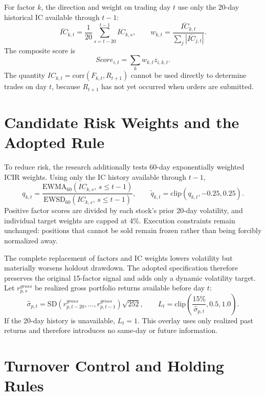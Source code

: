 \documentclass[a4paper,11pt,openany]{report}
\begin{document}
For factor $k$, the direction and weight on trading day $t$ use only the 20-day historical IC available through $t-1$:
\begin{equation}
\bar{IC}_{k,t}=\frac{1}{20}\sum_{s=t-20}^{t-1}IC_{k,s},\qquad
w_{k,t}=\frac{\bar{IC}_{k,t}}{\sum_j |\bar{IC}_{j,t}|}.
\end{equation}
The composite score is
\begin{equation}
Score_{i,t}=\sum_k w_{k,t}z_{i,k,t}.
\end{equation}
The quantity $IC_{k,t}=\mathrm{corr}(F_{k,t},R_{t+1})$ cannot be used directly to determine trades on day $t$, because $R_{t+1}$ has not yet occurred when orders are submitted.

\section{Candidate Risk Weights and the Adopted Rule}

To reduce risk, the research additionally tests 60-day exponentially weighted ICIR weights. Using only the IC history available through $t-1$,
\begin{equation}
q_{k,t}=\frac{\mathrm{EWMA}_{60}(IC_{k,s},\,s\le t-1)}{\mathrm{EWSD}_{60}(IC_{k,s},\,s\le t-1)},\qquad
\tilde q_{k,t}=\mathrm{clip}(q_{k,t},-0.25,0.25).
\end{equation}
Positive factor scores are divided by each stock's prior 20-day volatility, and individual target weights are capped at 4\%. Execution constraints remain unchanged: positions that cannot be sold remain frozen rather than being forcibly normalized away.

The complete replacement of factors and IC weights lowers volatility but materially worsens holdout drawdown. The adopted specification therefore preserves the original 15-factor signal and adds only a dynamic volatility target. Let $r^{gross}_{p,s}$ be realized gross portfolio returns available before day $t$:
\begin{equation}
\widehat\sigma_{p,t}=\mathrm{SD}(r^{gross}_{p,t-20},\ldots,r^{gross}_{p,t-1})\sqrt{252},\qquad
L_t=\mathrm{clip}\left(\frac{15\%}{\widehat\sigma_{p,t}},0.5,1.0\right).
\end{equation}
If the 20-day history is unavailable, $L_t=1$. This overlay uses only realized past returns and therefore introduces no same-day or future information.

\section{Turnover Control and Holding Rules}
\end{document}
